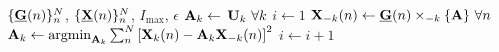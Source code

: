 \begin{algorithmic}[1]
	\Require $\{\underline{\mathbf{G}}(n)\}_n^N$, $\{\underline{\mathbf{X}}(n)\}_n^N$, $I_\text{max}$, $\epsilon$
	\State $\mathbf{A}_k \gets $ $\mathbf{U}_k \ \forall k$
	\State $i\gets 1$
	\Repeat
	\State $\mat{X}_{-k}(n)\gets\ten{G}(n)\mmprsi{\mat{A}}{k} \ \forall n$
	\State
	$\mathbf{A}_k\gets\textstyle{\mathop{\mathrm{argmin}}_{\mathbf{A}_k}\sum_n^N}\left[\mathbf{X}_k(n)-\mathbf{A}_k\mathbf{X}_{-k}(n)\right]^2$
	\EndFor
	\State $i\gets i+1$
\end{algorithmic}
